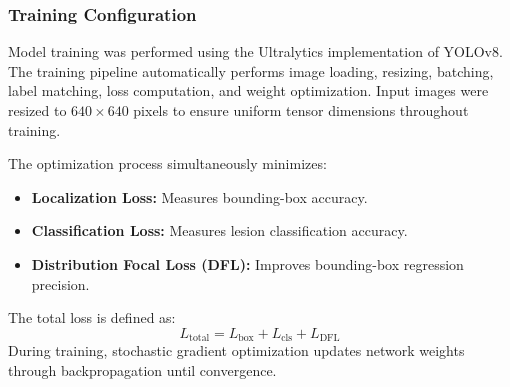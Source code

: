 \subsubsection{Training Configuration}
Model training was performed using the Ultralytics implementation of YOLOv8. The training pipeline automatically performs image loading, resizing, batching, label matching, loss computation, and weight optimization. Input images were resized to $640 \times 640$ pixels to ensure uniform tensor dimensions throughout training.

The optimization process simultaneously minimizes:
\begin{itemize}
	\item \textbf{Localization Loss:} Measures bounding-box accuracy.
	\item \textbf{Classification Loss:} Measures lesion classification accuracy.
	\item \textbf{Distribution Focal Loss (DFL):} Improves bounding-box regression precision.
\end{itemize}
The total loss is defined as:
\begin{equation}
	L_{\text{total}} = L_{\text{box}} + L_{\text{cls}} + L_{\text{DFL}}
\end{equation}
During training, stochastic gradient optimization updates network weights through backpropagation until convergence.